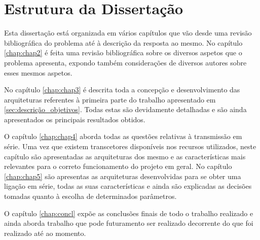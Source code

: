 \section{Estrutura da Dissertação} \label{sec:struct}

Esta dissertação está organizada em vários capítulos que vão desde uma revisão bibliográfica do problema até à descrição da resposta ao mesmo. 
No capítulo \ref{chap:chap2} é feita uma revisão bibliográfica sobre os diversos aspetos que o problema apresenta, expondo também considerações de diversos autores sobre esses mesmos aspetos.  

No capítulo \ref{chap:chap3} é descrita toda a concepção e desenvolvimento das arquiteturas referentes à primeira parte do trabalho apresentado em \ref{sec:descrição_objetivos}. Todas estas são devidamente detalhadas e são ainda apresentados os principais resultados obtidos.

O capítulo \ref{chap:chap4} aborda todas as questões relativas à transmissão em série. Uma vez que existem transcetores disponíveis nos recursos utilizados, neste capítulo são apresentadas as arquiteturas dos mesmo e as características mais relevantes para o correto funcionamento do projeto em geral. No capítulo \ref{chap:chap5} são apresentas as arquiteturas desenvolvidas para se obter uma ligação em série, todas as suas características e ainda são explicadas as decisões tomadas quanto à escolha de determinados parâmetros.

O capítulo \ref{chap:concl} expõe as conclusões finais de todo o trabalho realizado e ainda aborda trabalho que pode futuramento ser realizado decorrente do que foi realizado até ao momento.

